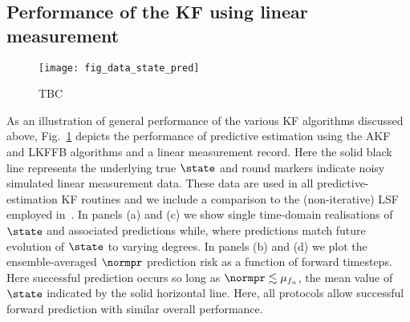 \subsection{Performance of the KF using linear measurement}
\begin{figure}
    \texttt{[image: fig\_data\_state\_pred]}
    \caption{\label{fig:main:fig_data_all} TBC}
    \end{figure}  



As an illustration of general performance of the various KF algorithms discussed above, Fig.~\ref{fig:main:fig_data_all} depicts the performance of predictive estimation using the AKF and LKFFB algorithms and a linear measurement record.  Here the solid black line represents the underlying true $\state$ and round markers indicate noisy simulated linear measurement data.  These data are used in all predictive-estimation KF routines and we include a comparison to the (non-iterative) LSF employed in~\cite{mavadia2017}.  In panels (a) and (c) we show single time-domain realisations of $\state$  and associated predictions while, where predictions match future evolution of $\state$ to varying degrees.  In panels (b) and (d) we plot the ensemble-averaged $\normpr$ prediction risk as a function of forward timesteps.  Here successful prediction occurs so long as $\normpr\lesssim \mu_{f_{n}}$, the mean value of $\state$ indicated by the solid horizontal line. Here, all protocols allow successful forward prediction with similar overall performance.


